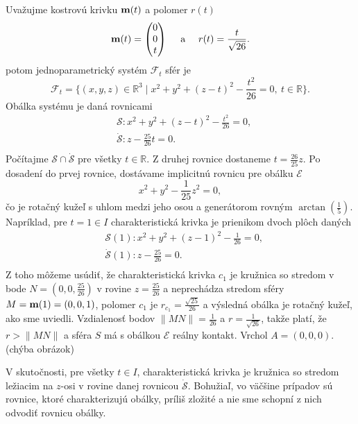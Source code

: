 \begin{example}
Uvažujme kostrovú krivku $\bold{m}(t)$ a polomer $r(t)$
$$
\bold{m}(t) = \begin{pmatrix} 0 \\ 0 \\ t \end{pmatrix} \quad \text{ a } \quad r(t) = \frac{t}{\sqrt{26}}.
$$
potom jednoparametrický systém $\mathcal{F}_t$ sfér je
$$
\mathcal{F}_t = \{(x, y, z) \in \mathbb{R}^3 \mid x^2 + y^2 + (z - t)^2 - \frac{t^2}{26} = 0, \ t \in \mathbb{R}\}.
$$
Obálka systému je daná rovnicami
\begin{align*}
&\mathcal{S} \colon x^2 + y^2 + (z - t)^2 - \frac{t^2}{26} = 0, \\
&\mathcal{\dot{S}} \colon z - \frac{25}{26}t = 0. \\
\end{align*}
Počítajme $ \mathcal{S} \cap \mathcal{\dot{S}} $ pre všetky $t \in \mathbb{R}.$ Z druhej rovnice dostaneme $t = \frac{26}{25}z$. Po dosadení do prvej rovnice, dostávame implicitnú rovnicu pre obálku $\mathcal{E}$
$$
x^2 + y^2 - \frac{1}{25}z^2 = 0,
$$
čo je rotačný kužeľ s uhlom medzi jeho osou a generátorom rovným $\arctan\left(\frac{1}{5}\right)$.
Napríklad, pre $t = 1 \in I$ charakteristická krivka je prienikom dvoch plôch daných
\begin{align*}
&\mathcal{S}(1) \colon x^2 + y^2 + (z - 1)^2 - \frac{1}{26} = 0, \\
&\mathcal{\dot{S}}(1) \colon z - \frac{25}{26} = 0. \\
\end{align*}
Z toho môžeme usúdiť, že charakteristická krivka $c_1$ je kružnica so stredom v bode $N = (0, 0, \frac{25}{26})$ v rovine $z = \frac{25}{26}$ a neprechádza stredom sféry $M = \bold{m}(1) = (0,0,1)$, polomer $c_1$ je $r_{c_{1}} = \frac{\sqrt{25}}{26}$ a výsledná obálka je rotačný kužeľ, ako sme uviedli. Vzdialenosť bodov $ \|MN\| = \frac{1}{26}$ a $r = \frac{1}{\sqrt{26}}$, takže platí, že $r > \|MN\|$ a sféra $S$ má s obálkou $\mathcal{E}$ reálny kontakt. Vrchol $A = (0,0,0)$. (chýba obrázok)
\end{example}
V skutočnosti, pre všetky $t \in I$, charakteristická krivka je kružnica so stredom ležiacim na $z$-osi v rovine danej rovnicou $\mathcal{\dot{S}} $.
Bohužiaľ, vo väčšine prípadov sú rovnice, ktoré charakterizujú obálky, príliš zložité a nie sme schopní z nich odvodiť rovnicu obálky.

